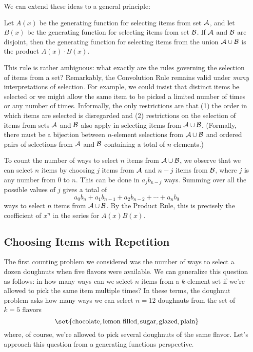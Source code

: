 We can extend these ideas to a general principle:


\begin{rul}
Let $A(x)$ be the generating function for selecting items from set
${\cal A}$, and let $B(x)$ be the generating function for selecting
items from set ${\cal B}$.  If ${\cal A}$ and ${\cal B}$ are disjoint,
then the generating function for selecting items from the union ${\cal
A} \cup {\cal B}$ is the product $A(x) \cdot B(x)$.
\end{rul}

This rule is rather ambiguous: what exactly are the rules governing
the selection of items from a set?  Remarkably, the Convolution Rule
remains valid under \emph{many} interpretations of selection.  For
example, we could insist that distinct items be selected or we might
allow the same item to be picked a limited number of times or any
number of times.  Informally, the only restrictions are that (1) the
order in which items are selected is disregarded and (2) restrictions
on the selection of items from sets ${\cal A}$ and ${\cal B}$ also
apply in selecting items from ${\cal A} \cup {\cal B}$.  (Formally,
there must be a bijection between $n$-element selections from ${\cal
A} \cup {\cal B}$ and ordered pairs of selections from ${\cal A}$ and
${\cal B}$ containing a total of $n$ elements.)

To count the number of ways to select $n$ items from ${\cal A} \cup {\cal
B}$, we observe that we can select $n$ items by choosing $j$ items from
${\cal A}$ and $n - j$ items from ${\cal B}$, where $j$ is any number from
0 to $n$.  This can be done in $a_j b_{n-j}$ ways.  Summing over all the
possible values of $j$ gives a total of
\[
a_0 b_n + a_1 b_{n-1} + a_2 b_{n-2} + \cdots + a_n b_0
\]
ways to select $n$ items from ${\cal A} \cup {\cal B}$.  By the Product
Rule, this is precisely the coefficient of $x^n$ in the series for
$A(x)B(x)$.


\subsection{Choosing Items with Repetition}
\label{sec:rep}

The first counting problem we considered was the number of ways to
select a dozen doughnuts when five flavors were available.  We can
generalize this question as follows: in how many ways can we select
$n$ items from a $k$-element set if we're allowed to pick the same
item multiple times?  In these terms, the doughnut problem asks how
many ways we can select $n=12$ doughnuts from the set of $k=5$ flavors
\[
\set{\text{chocolate}, \text{lemon-filled}, \text{sugar}, \text{glazed}, \text{plain}}
\]
%
where, of course, we're allowed to pick several doughnuts of the same
flavor.   Let's approach this question from a generating functions
perspective.

